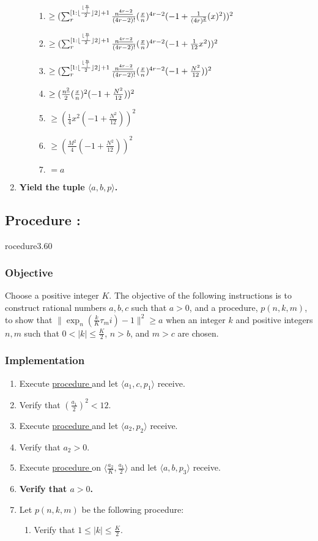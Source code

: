 \documentclass{article}
\newcommand{\ul}[1]{\protect\underline{#1}}
\newcounter{procedure}[part]
\newcommand{\procedure}[1]{\subsection*{Procedure \thepart:\theprocedure}\label{sec:procedure #1}\global\expandafter\edef\csname procedure#1\endcsname{\thepart:\theprocedure}\addtocounter{procedure}{1}}
\newcommand{\objective}{\subsubsection*{Objective}}
\newcommand{\implementation}{\subsubsection*{Implementation}}
\newcommand{\procedurehr}[1]{\hyperref[sec:procedure #1]{procedure \expandafter\csname procedure#1\endcsname}}
\begin{document}
\begin{multicols}{2}
\begin{enumerate}
\begin{enumerate}
\begin{enumerate}
							\item $\ge(\sum_r^{[1:{\lfloor\frac{\lfloor\frac{n}]}{2}\rfloor}{2}\rfloor+1}\frac{n^{\ul{4r-2}}}{(4r-2)!}(\frac{x}{n})^{4r-2}(-1+\frac{1}{(4r)^{\ul{2}}}(x)^{2}))^2$
							\item $\ge(\sum_r^{[1:{\lfloor\frac{\lfloor\frac{n}]}{2}\rfloor}{2}\rfloor+1}\frac{n^{\ul{4r-2}}}{(4r-2)!}(\frac{x}{n})^{4r-2}(-1+\frac{1}{12}x^{2}))^2$
							\item $\ge(\sum_r^{[1:{\lfloor\frac{\lfloor\frac{n}]}{2}\rfloor}{2}\rfloor+1}\frac{n^{\ul{4r-2}}}{(4r-2)!}(\frac{x}{n})^{4r-2}(-1+\frac{N^2}{12}))^2$
							\item $\ge(\frac{n^{\ul{2}}}{2}(\frac{x}{n})^{2}(-1+\frac{N^2}{12}))^2$
							\item $\ge(\frac{1}{4}x^{2}(-1+\frac{N^2}{12}))^2$
							\item $\ge(\frac{M^2}{4}(-1+\frac{N^2}{12}))^2$
							\item $=a$
						\end{enumerate}
					\end{enumerate}
					\item \textbf{Yield the tuple $\langle a,b,p\rangle$.}
				\end{enumerate}
		\procedure{3.60}
			\objective
				Choose a positive integer $K$. The objective of the following instructions is to construct rational numbers $a,b,c$ such that $a>0$, and a procedure, $p(n,k,m)$, to show that $\lVert\exp_n(\frac{k}{K}\tau_mi)-1\rVert^2\ge a$ when an integer $k$ and positive integers $n,m$ such that $0<\lvert k\rvert\le\frac{K}{2}$, $n>b$, and $m>c$ are chosen.
			\implementation
				\begin{enumerate}
					\item Execute \procedurehr{3.50} and let $\langle a_1,c,p_1\rangle$ receive.
					\item Verify that $(\frac{a_1}{2})^2<12$.
					\item Execute \procedurehr{3.49} and let $\langle a_2,p_2\rangle$ receive.
					\item Verify that $a_2>0$.
					\item Execute \procedurehr{3.90} on $\langle\frac{a_2}{K},\frac{a_1}{2}\rangle$ and let $\langle a,b,p_3\rangle$ receive.
					\item \textbf{Verify that $a>0$.}
					\item Let $p(n,k,m)$ be the following procedure:
					\begin{enumerate}
						\item Verify that $1\le\lvert k\rvert\le\frac{K}{2}$.

\end{enumerate}
\end{enumerate}
\end{multicols}
\end{document}
